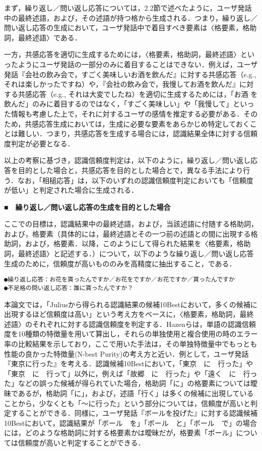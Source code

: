 \documentclass[japanese]{jnlp_1.4}
\begin{document}
まず，繰り返し／問い返し応答については，2.2節で述べたように，ユーザ発話中の最終述語，および，その述語が持つ格から生成される．つまり，繰り返し／問い返し応答の生成において，ユーザ発話中で着目すべき要素は〈格要素，格助詞，最終述語〉である．

一方，共感応答を適切に生成するためには，〈格要素，格助詞，最終述語〉といったようにユーザ発話の一部分のみに着目することはできない．例えば，ユーザ発話『会社の飲み会で，すごく美味しいお酒を飲んだ』に対する共感応答（e.g., それは楽しかったですね）や，『会社の飲み会で，我慢してお酒を飲んだ』に対する共感応答（e.g., それは大変でしたね）を適切に生成するためには，「お酒 を 飲んだ」のみに着目するのではなく，「すごく美味しい」や「我慢して」といった情報も考慮した上で，それに対するユーザの感情を推定する必要がある．そのため，共感応答生成においては，生成に必要な要素をあらかじめ特定しておくことは難しい．つまり，共感応答を生成する場合には，認識結果全体に対する信頼度判定が必要となる．

以上の考察に基づき，認識信頼度判定は，以下のように，繰り返し／問い返し応答を目的とした場合と，共感応答を目的とした場合とで，異なる手法により行う．なお，「相槌応答」は，以下のいずれの認識信頼度判定においても「信頼度が低い」と判定された場合に生成される．


\noindent■　{\bfseries 繰り返し／問い返し応答の生成を目的とした場合}

ここでの目標は，認識結果中の最終述語，および，当該述語に付随する格助詞，および，格要素（具体的には，最終述語とその一つ前の述語との間に出現する格助詞，および，格要素．以降，このようにして得られた結果を〈格要素，格助詞，最終述語〉と記述する．）について，以下のような繰り返し／問い返し応答生成のために，信頼度が高いもののみを高精度に抽出すること，である．

\begin{verbatim}
●繰り返し応答：お花を貰ったんですか／お花をですか／お花ですか／貰ったんですか
●不足格の問い返し応答：誰に貰ったんですか？
\end{verbatim}


本論文では，「Juliusから得られる認識結果の候補10Bestにおいて，多くの候補に出現するほど信頼度は高い」という考え方をベースに，〈格要素，格助詞，最終述語〉のそれぞれに対する認識信頼度を判定する．Hazenら\cite{no41}は，単語の認識信頼度を10種類の特徴量を用いて算出し，それらの単独使用と複合使用の時のエラー率の比較結果を示しており，ここで用いた手法は，その単独特徴量中でもっとも性能の良かった特徴量(N-best Purity)の考え方と近い．例として，ユーザ発話『東京に行った』を考える．認識候補10Bestにおいて，「東京　に　行った」や「東京　に　行って」以外に，例えば「故郷　に　行った」や「遠く　に　行った」などの誤った候補が得られていた場合，格助詞「に」の格要素については曖昧であるが，格助詞「に」，および，述語「行く」は多くの候補に出現していることから，少なくとも「〜に行った」という部分については，信頼度が高いと判定することができる．同様に，ユーザ発話『ボールを投げた』に対する認識候補10Bestにおいて，認識結果が「ボール　を」「ボール　と」「ボール　で」の場合には，どのような格助詞に対する格要素かは曖昧だが，格要素「ボール」については信頼度が高いと判定することができる． 
\end{document}
